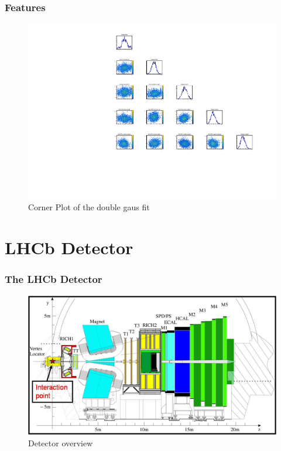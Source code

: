 \documentclass{beamer}
\begin{document}
\begin{frame}
 \frametitle{Features}

 \begin{figure}
  \includegraphics[width=0.8\linewidth]{figures/twogausCorner}
  \caption{Corner Plot of the double gaus fit}
 \end{figure}

\end{frame}


\section{LHCb Detector}

\begin{frame}
  \frametitle{The LHCb Detector}

  \begin{figure}
    \includegraphics[width=1.0\linewidth]{figures/lhcb_detector}
    \caption{Detector overview}
  \end{figure}

\end{frame}
\end{document}
